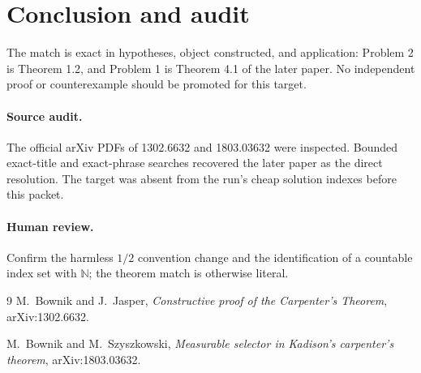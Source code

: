 \documentclass[11pt]{article}
\begin{document}
\clearpage
\section{Conclusion and audit}

The match is exact in hypotheses, object constructed, and application:
Problem 2 is Theorem 1.2, and Problem 1 is Theorem 4.1 of the later paper.
No independent proof or counterexample should be promoted for this target.

\paragraph{Source audit.}
The official arXiv PDFs of 1302.6632 and 1803.03632 were inspected.  Bounded
exact-title and exact-phrase searches recovered the later paper as the direct
resolution.  The target was absent from the run's cheap solution indexes
before this packet.

\paragraph{Human review.}
Confirm the harmless $1/2$ convention change and the identification of a
countable index set with $\mathbb N$; the theorem match is otherwise literal.

\begin{thebibliography}{9}
M.~Bownik and J.~Jasper,
\emph{Constructive proof of the Carpenter's Theorem}, arXiv:1302.6632.

M.~Bownik and M.~Szyszkowski,
\emph{Measurable selector in Kadison's carpenter's theorem},
arXiv:1803.03632.
\end{thebibliography}
\end{document}
